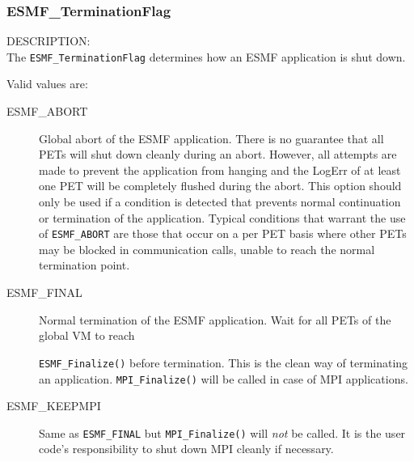 
\subsubsection{ESMF\_TerminationFlag}
\label{app:terminationflag}

{\sf DESCRIPTION:\\}
The {\tt ESMF\_TerminationFlag} determines how an ESMF application is shut down.

Valid values are:
\begin{description}
   \item [ESMF\_ABORT] 
         Global abort of the ESMF application. There is no guarantee 
         that all PETs will shut down cleanly during an abort. However, all
         attempts are made to prevent the application from hanging and the
         LogErr of at least one PET will be completely flushed during the abort.
         This option should only be used if a condition is detected that
         prevents normal continuation or termination of the application.
         Typical conditions that warrant the use of {\tt ESMF\_ABORT} are those
         that occur on a per PET basis where other PETs may be blocked in 
         communication calls, unable to reach the normal termination point.
   \item [ESMF\_FINAL]
         Normal termination of the ESMF application. Wait for all PETs of the
         global VM to reach 

	{\tt ESMF\_Finalize()} before termination. This is
         the clean way of terminating an application. {\tt MPI\_Finalize()} will
         be called in case of MPI applications.
   \item [ESMF\_KEEPMPI]
         Same as {\tt ESMF\_FINAL} but {\tt MPI\_Finalize()} will {\em not}
         be called. It is the user code's responsibility to shut down MPI
         cleanly if necessary.
\end{description}
